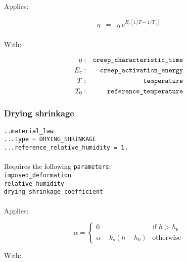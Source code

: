\documentclass[10pt]{article}
\begin{document}
\paragraph{}Applies:

\begin{eqnarray}
	\eta & = & \eta\ e^{E_c \left[ 1/T - 1/T_0 \right]} \\
\end{eqnarray}

With:

\begin{eqnarray}
	\eta & : & \verb+creep_characteristic_time+ \notag \\
	E_c & : & \verb+creep_activation_energy+\notag  \\
	T & : & \verb+temperature+ \notag \\
	T_0 & : & \verb+reference_temperature+ \notag 
\end{eqnarray}

\subsubsection{Drying shrinkage}

\noindent \verb+..material_law+\\
\verb+...type = DRYING_SHRINKAGE+\\
\verb+...reference_relative_humidity = 1.+

\paragraph{}Requires the following \verb+parameters+:\\

\noindent \verb+imposed_deformation+\\
\verb+relative_humidity+\\
\verb+drying_shrinkage_coefficient+

\paragraph{}Applies:

\begin{equation}
	\alpha = \left\{ \begin{array}{cl} 0 & \text{if } h > h_0 \\ \alpha - k_s ( h - h_0 ) & \text{otherwise} \end{array} \right.
\end{equation}

With:
\end{document}
